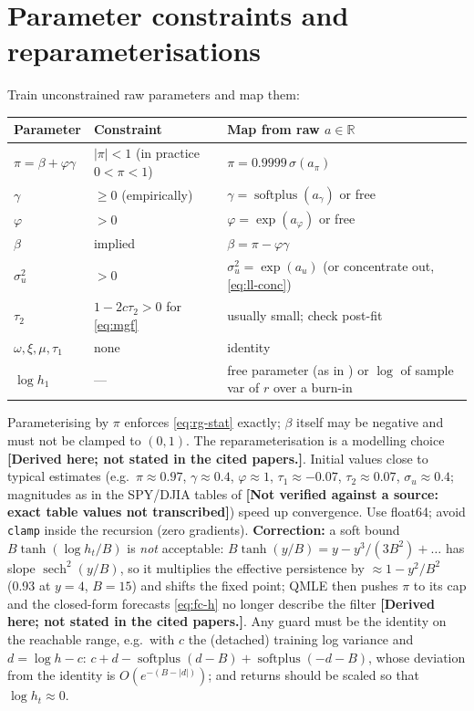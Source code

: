 \documentclass[11pt]{article}
\newcommand{\unverified}[1]{\textbf{[Not verified against a source: #1]}}
\newcommand{\derived}{\textbf{[Derived here; not stated in the cited papers.]}}
\begin{document}
\section{Parameter constraints and reparameterisations}\label{sec:param}
Train unconstrained raw parameters and map them:
\begin{center}
\begin{tabular}{@{}lll@{}}
\toprule
Parameter & Constraint & Map from raw $a\in\mathbb R$\\
\midrule
$\pi=\beta+\varphi\gamma$ & $|\pi|<1$ (in practice $0<\pi<1$) & $\pi = 0.9999\,\sigma(a_\pi)$\\
$\gamma$ & $\ge0$ (empirically) & $\gamma=\operatorname{softplus}(a_\gamma)$ or free\\
$\varphi$ & $>0$ & $\varphi=\exp(a_\varphi)$ or free\\
$\beta$ & implied & $\beta=\pi-\varphi\gamma$\\
$\sigma_u^2$ & $>0$ & $\sigma_u^2=\exp(a_u)$ (or concentrate out, \eqref{eq:ll-conc})\\
$\tau_2$ & $1-2c\tau_2>0$ for \eqref{eq:mgf} & usually small; check post-fit\\
$\omega,\xi,\mu,\tau_1$ & none & identity\\
$\log h_1$ & --- & free parameter (as in \cite{HH2016}) or $\log$ of sample var of $r$ over a burn-in\\
\bottomrule
\end{tabular}
\end{center}
Parameterising by $\pi$ enforces \eqref{eq:rg-stat} exactly; $\beta$ itself may be negative
and must not be clamped to $(0,1)$. The reparameterisation is a modelling choice
\derived. Initial values close to typical estimates (e.g.\ $\pi\approx0.97$,
$\gamma\approx0.4$, $\varphi\approx1$, $\tau_1\approx-0.07$, $\tau_2\approx0.07$,
$\sigma_u\approx0.4$; magnitudes as in the SPY/DJIA tables of \cite{HHS2012}
\unverified{exact table values not transcribed}) speed up convergence. Use float64; avoid
\texttt{clamp} inside the recursion (zero gradients). \textbf{Correction:} a soft bound
$B\tanh(\log h_t/B)$ is \emph{not} acceptable: $B\tanh(y/B)=y-y^3/(3B^2)+\dots$ has slope
$\operatorname{sech}^2(y/B)$, so it multiplies the effective persistence by $\approx1-y^2/B^2$
(0.93 at $y=4$, $B=15$) and shifts the fixed point; QMLE then pushes $\pi$ to its cap and the
closed-form forecasts \eqref{eq:fc-h} no longer describe the filter \derived. Any guard must be
the identity on the reachable range, e.g.\ with $c$ the (detached) training log variance and
$d=\log h-c$: $c+d-\operatorname{softplus}(d-B)+\operatorname{softplus}(-d-B)$, whose deviation from the
identity is $O(e^{-(B-|d|)})$; and returns should be scaled so that $\log h_t\approx0$.
\end{document}
